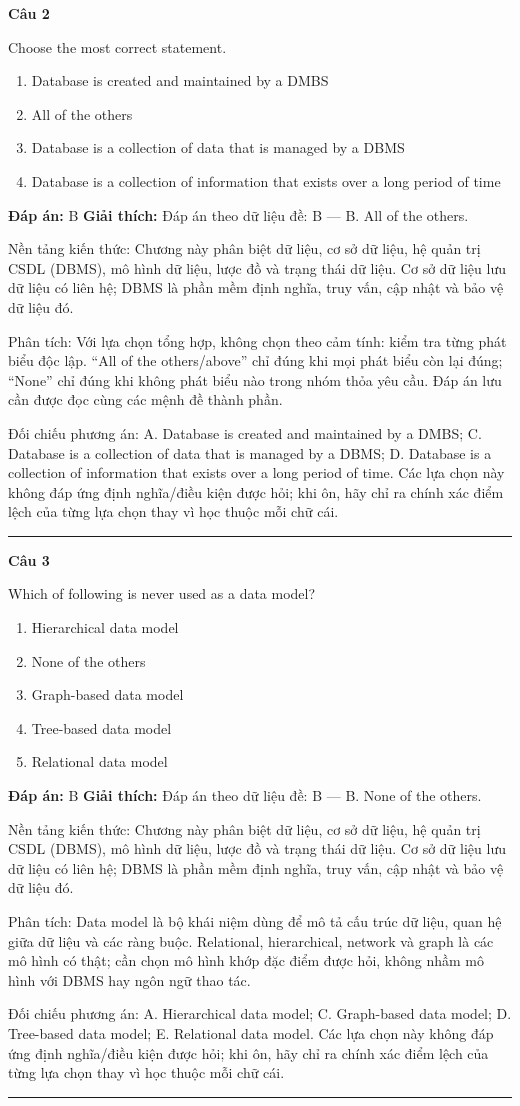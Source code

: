 \documentclass[11pt,a4paper]{article}
\newenvironment{question}[1]{%
  \par\vspace{1em}\noindent\textbf{\large Câu #1}\par\vspace{0.4em}
}{%
  \par\vspace{1em}\hrule\vspace{0.6em}
}
\newenvironment{choices}{%
  \begin{enumerate}[label=\textbf{\Alph*.},leftmargin=2.2em,itemsep=2pt,topsep=3pt]
}{%
  \end{enumerate}
}
\newcommand{\choice}{\item}
\begin{document}
\begin{question}{2}
Choose the most correct statement.
\begin{choices}
\choice Database is created and maintained by a DMBS
\choice All of the others
\choice Database is a collection of data that is managed by a DBMS
\choice Database is a collection of information that exists over a long period of time
\end{choices}
\textbf{Đáp án:} B
\textbf{Giải thích:} Đáp án theo dữ liệu đề: B — B. All of the others.

Nền tảng kiến thức: Chương này phân biệt dữ liệu, cơ sở dữ liệu, hệ quản trị CSDL (DBMS), mô hình dữ liệu, lược đồ và trạng thái dữ liệu. Cơ sở dữ liệu lưu dữ liệu có liên hệ; DBMS là phần mềm định nghĩa, truy vấn, cập nhật và bảo vệ dữ liệu đó.

Phân tích: Với lựa chọn tổng hợp, không chọn theo cảm tính: kiểm tra từng phát biểu độc lập. “All of the others/above” chỉ đúng khi mọi phát biểu còn lại đúng; “None” chỉ đúng khi không phát biểu nào trong nhóm thỏa yêu cầu. Đáp án lưu cần được đọc cùng các mệnh đề thành phần.

Đối chiếu phương án: A. Database is created and maintained by a DMBS; C. Database is a collection of data that is managed by a DBMS; D. Database is a collection of information that exists over a long period of time. Các lựa chọn này không đáp ứng định nghĩa/điều kiện được hỏi; khi ôn, hãy chỉ ra chính xác điểm lệch của từng lựa chọn thay vì học thuộc mỗi chữ cái.
\end{question}

\begin{question}{3}
Which of following is never used as a data model?
\begin{choices}
\choice Hierarchical data model
\choice None of the others
\choice Graph-based data model
\choice Tree-based data model
\choice Relational data model
\end{choices}
\textbf{Đáp án:} B
\textbf{Giải thích:} Đáp án theo dữ liệu đề: B — B. None of the others.

Nền tảng kiến thức: Chương này phân biệt dữ liệu, cơ sở dữ liệu, hệ quản trị CSDL (DBMS), mô hình dữ liệu, lược đồ và trạng thái dữ liệu. Cơ sở dữ liệu lưu dữ liệu có liên hệ; DBMS là phần mềm định nghĩa, truy vấn, cập nhật và bảo vệ dữ liệu đó.

Phân tích: Data model là bộ khái niệm dùng để mô tả cấu trúc dữ liệu, quan hệ giữa dữ liệu và các ràng buộc. Relational, hierarchical, network và graph là các mô hình có thật; cần chọn mô hình khớp đặc điểm được hỏi, không nhầm mô hình với DBMS hay ngôn ngữ thao tác.

Đối chiếu phương án: A. Hierarchical data model; C. Graph-based data model; D. Tree-based data model; E. Relational data model. Các lựa chọn này không đáp ứng định nghĩa/điều kiện được hỏi; khi ôn, hãy chỉ ra chính xác điểm lệch của từng lựa chọn thay vì học thuộc mỗi chữ cái.
\end{question}
\end{document}
